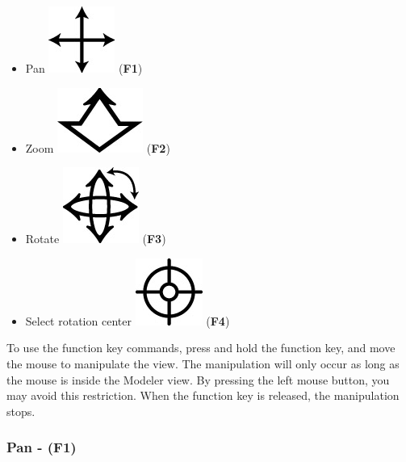\begin{itemize}
\item Pan \includegraphics[scale=0.7]{Figures/pan} (\textbf{F1})
\item Zoom \includegraphics[scale=0.7]{Figures/zoom} (\textbf{F2})
\item Rotate \includegraphics[scale=0.7]{Figures/rotate} (\textbf{F3})
\item Select rotation center
  \includegraphics[scale=0.7]{Figures/rotate_center} (\textbf{F4})
\end{itemize}


To use the function key commands, press and hold the function key,
and move the mouse to manipulate the view. The manipulation will only occur
as long as the mouse is inside the Modeler view.
By pressing the left mouse button, you may avoid this restriction.
When the function key is released, the manipulation stops.


\subsubsection{Pan - (F1)}

